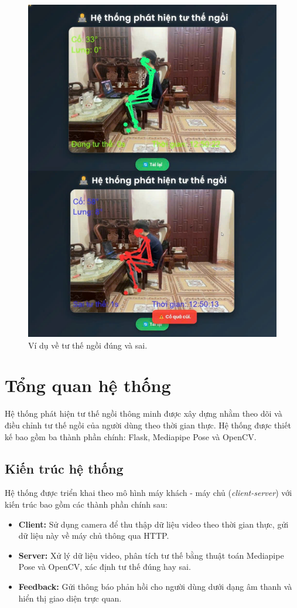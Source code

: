 \documentclass[journal,onecolumn]{IEEEtran}
\begin{document}
\begin{figure}[H]
    \centering
    \includegraphics[width=0.7\linewidth]{images/sitting_posture_example.png}
    \caption{Ví dụ về tư thế ngồi đúng và sai.}
    \label{fig:posture_example}
\end{figure}

\section{\textbf{Tổng quan hệ thống}}
Hệ thống phát hiện tư thế ngồi thông minh được xây dựng nhằm theo dõi và điều chỉnh tư thế ngồi của người dùng theo thời gian thực. Hệ thống được thiết kế bao gồm ba thành phần chính: Flask, Mediapipe Pose và OpenCV.  

\subsection{\textbf{Kiến trúc hệ thống}}
Hệ thống được triển khai theo mô hình máy khách - máy chủ (\textit{client-server}) với kiến trúc bao gồm các thành phần chính sau:
\begin{itemize}
    \item \textbf{Client:} Sử dụng camera để thu thập dữ liệu video theo thời gian thực, gửi dữ liệu này về máy chủ thông qua HTTP.
    \item \textbf{Server:} Xử lý dữ liệu video, phân tích tư thế bằng thuật toán Mediapipe Pose và OpenCV, xác định tư thế đúng hay sai.
    \item \textbf{Feedback:} Gửi thông báo phản hồi cho người dùng dưới dạng âm thanh và hiển thị giao diện trực quan.
\end{itemize}
\end{document}
